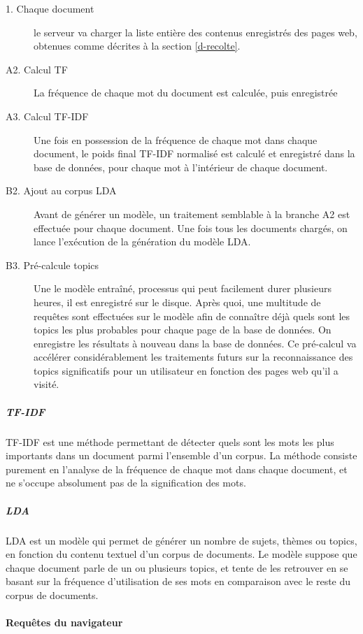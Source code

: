 				\begin{description}
					\item[1. Chaque document] le serveur va charger la liste entière des contenus enregistrés des pages web, obtenues comme décrites à la section \ref{d-recolte}.
					\item[A2. Calcul TF] La fréquence de chaque mot du document est calculée, puis enregistrée
					\item[A3. Calcul TF-IDF] Une fois en possession de la fréquence de chaque mot dans chaque document, le poids final TF-IDF normalisé est calculé et enregistré dans la base de données, pour chaque mot à l'intérieur de chaque document.
					\item[B2. Ajout au corpus LDA] Avant de générer un modèle, un traitement semblable à la branche A2 est effectuée pour chaque document. Une fois tous les documents chargés, on lance l'exécution de la génération du modèle LDA.
					\item[B3. Pré-calcule topics] Une le modèle entraîné, processus qui peut facilement durer plusieurs heures, il est enregistré sur le disque. Après quoi, une multitude de requêtes sont effectuées sur le modèle afin de connaître déjà quels sont les topics les plus probables pour chaque page de la base de données. On enregistre les résultats à nouveau dans la base de données. Ce pré-calcul va accélérer considérablement les traitements futurs sur la reconnaissance des topics significatifs pour un utilisateur en fonction des pages web qu'il a visité. 

				\end{description}

				\subparagraph{TF-IDF}

					TF-IDF est une méthode permettant de détecter quels sont les mots les plus importants dans un document parmi l'ensemble d'un corpus. La méthode consiste purement en l'analyse de la fréquence de chaque mot dans chaque document, et ne s'occupe absolument pas de la signification des mots.

				\subparagraph{LDA}

					LDA est un modèle qui permet de générer un nombre de sujets, thèmes ou topics, en fonction du contenu textuel d'un corpus de documents. Le modèle suppose que chaque document parle de un ou plusieurs topics, et tente de les retrouver en se basant sur la fréquence d'utilisation de ses mots en comparaison avec le reste du corpus de documents. 

			\paragraph{Requêtes du navigateur}

